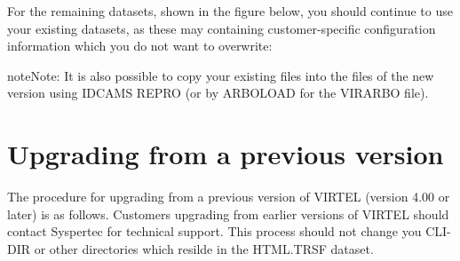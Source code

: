 \documentclass[letterpaper,10pt,english]{sphinxmanual}
\begin{document}

For the remaining datasets, shown in the figure below, you should continue to use your existing datasets, as these may containing customer-specific configuration information which you do not want to overwrite:

\begin{sphinxVerbatim}[commandchars=\\\{\}]
\end{sphinxVerbatim}


\begin{sphinxadmonition}{note}{Note:}
It is also possible to copy your existing files into the files of the new version using IDCAMS REPRO (or by ARBOLOAD for the VIRARBO file).
\end{sphinxadmonition}

\newpage

\ignorespaces 

\section{Upgrading from a previous version}
\label{\detokenize{Installation_Guide:index-6}}\label{\detokenize{Installation_Guide:id2}}
The procedure for upgrading from a previous version of VIRTEL (version 4.00 or later) is as follows. Customers upgrading from earlier versions of VIRTEL should contact Syspertec for technical support. This process should not change you CLI-DIR or other directories which resilde in the HTML.TRSF dataset.
\end{document}
